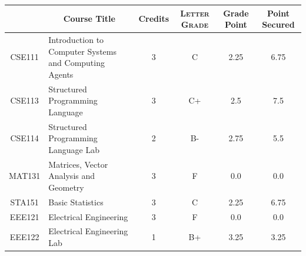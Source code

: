 \documentclass[11pt]{article}
\newcommand*{\numtwo}[1]{\pgfmathprintnumber[
                    fixed, precision=2, fixed zerofill=true]{#1}}
\begin{document}
                \begin{center}
                    \renewcommand{\arraystretch}{1.08}
                    
                \begin{tabular}{|c|l|c|>{\scshape}c|c|c|}
                \hline  \rule[-1ex]{0pt}{3.5ex} {\centering{\bf Course Code}} &  \multicolumn{1}{c|}{\textbf{Course Title}}  & {\bf Credits} & {\bf Letter Grade} & {\bf Grade Point} & {\bf Point Secured}  \\ 
                \hline   CSE111 &  Introduction to Computer Systems and Computing Agents		 & 3 & C & 2.25 & 6.75 \\ %
                \hline   CSE113 &  Structured Programming Language		 & 3 & C+ & 2.5 & 7.5 \\ %
                \hline   CSE114 &  Structured Programming Language Lab		 & 2 & B- & 2.75 & 5.5 \\ %
                \hline   MAT131 &  Matrices, Vector Analysis and Geometry		 & 3 & F & 0.0 & 0.0 \\ %
                \hline   STA151 &  Basic Statistics		 & 3 & C & 2.25 & 6.75 \\ %
                \hline   EEE121 &  Electrical Engineering		 & 3 & F & 0.0 & 0.0 \\ %
                \hline   EEE122 &  Electrical Engineering Lab		 & 1 & B+ & 3.25 & 3.25 \\ %

\hline                %
                \end{tabular}
                \end{center}
                \renewcommand{\arraystretch}{1.03}
\end{document}
